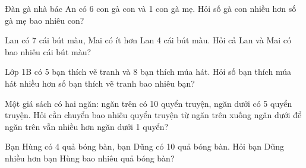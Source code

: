 \begin{ex} %
Đàn gà nhà bác An có 6 con gà con và 1 con gà mẹ. Hỏi số gà con nhiều hơn số gà mẹ bao nhiêu con?
\end{ex}

\begin{ex} %
Lan có 7 cái bút màu, Mai có ít hơn Lan 4 cái bút màu. Hỏi cả Lan và Mai có bao nhiêu cái bút màu?
\end{ex}

\begin{ex} %
Lớp 1B có 5 bạn thích vẽ tranh và 8 bạn thích múa hát. Hỏi số bạn thích múa hát nhiều hơn số bạn thích vẽ tranh bao nhiêu bạn?
\end{ex}

\begin{ex} %
Một giá sách có hai ngăn: ngăn trên có 10 quyển truyện, ngăn dưới có 5 quyển truyện. Hỏi cần chuyển bao nhiêu quyển truyện từ ngăn trên xuống ngăn dưới để ngăn trên vẫn nhiều hơn ngăn dưới 1 quyển?
\end{ex}

\begin{ex} %
Bạn Hùng có 4 quả bóng bàn, bạn Dũng có 10 quả bóng bàn. Hỏi bạn Dũng nhiều hơn bạn Hùng bao nhiêu quả bóng bàn?
\end{ex}
